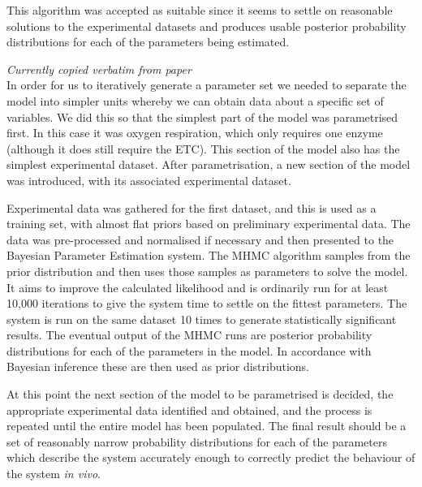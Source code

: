 This algorithm was accepted as suitable since it seems to settle on reasonable solutions to the experimental datasets and produces usable posterior probability distributions for each of the parameters being estimated.

\emph{Currently copied verbatim from paper}\\
In order for us to iteratively generate a parameter set we needed to separate the model into simpler units whereby we can obtain data about a specific set of variables. We did this so that the simplest part of the model was parametrised first. In this case it was oxygen respiration, which only requires one enzyme (although it does still require the ETC). This section of the model also has the simplest experimental dataset. After parametrisation, a new section of the model was introduced, with its associated experimental dataset.

Experimental data was gathered for the first dataset, and this is used as a training set, with almost flat priors based on preliminary experimental data. The data was pre-processed and normalised if necessary and then presented to the Bayesian Parameter Estimation system. The MHMC algorithm samples from the prior distribution and then uses those samples as parameters to solve the model. It aims to improve the calculated likelihood and is ordinarily run for at least 10,000 iterations to give the system time to settle on the fittest parameters. The system is run on the same dataset 10 times to generate statistically significant results. The eventual output of the MHMC runs are posterior probability distributions for each of the parameters in the model. In accordance with Bayesian inference these are then used as prior distributions.

At this point the next section of the model to be parametrised is decided, the appropriate experimental data identified and obtained, and the process is repeated until the entire model has been populated. The final result should be a set of reasonably narrow probability distributions for each of the parameters which describe the system accurately enough to correctly predict the behaviour of the system \textit{in vivo}.